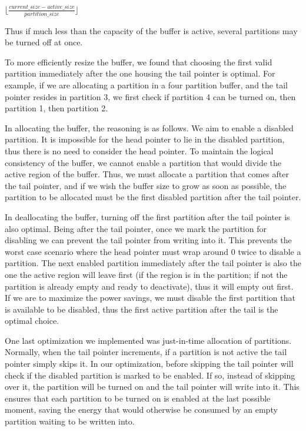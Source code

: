 \begin{center}
$\lfloor \frac{current\_size - active\_size}{partition\_size} \rfloor$
\end{center}

Thus if much less than the capacity of the buffer is active, several partitions may be turned off at once.

To more efficiently resize the buffer, we found that choosing the first valid partition immediately after the one housing the tail pointer is optimal. For example, if we are allocating a partition in a four partition buffer, and the tail pointer resides in partition 3, we first check if partition 4 can be turned on, then partition 1, then partition 2.

In allocating the buffer, the reasoning is as follows. We aim to enable a disabled partition. It is impossible for the head pointer to lie in the disabled partition, thus there is no need to consider the head pointer. To maintain the logical consistency of the buffer, we cannot enable a partition that would divide the active region of the buffer. Thus, we must allocate a partition that comes after the tail pointer, and if we wish the buffer size to grow as soon as possible, the partition to be allocated must be the first disabled partition after the tail pointer.

In deallocating the buffer, turning off the first partition after the tail pointer is also optimal. Being after the tail pointer, once we mark the partition for disabling we can prevent the tail pointer from writing into it. This prevents the worst case scenario where the head pointer must wrap around 0 twice to disable a partition. The next enabled partition immediately after the tail pointer is also the one the active region will leave first (if the region is in the partition; if not the partition is already empty and ready to deactivate), thus it will empty out first. If we are to maximize the power savings, we must disable the first partition that is available to be disabled, thus the first active partition after the tail is the optimal choice.

One last optimization we implemented was just-in-time allocation of partitions. Normally, when the tail pointer increments, if a partition is not active the tail pointer simply skips it. In our optimization, before skipping the tail pointer will check if the disabled partition is marked to be enabled. If so, instead of skipping over it, the partition will be turned on and the tail pointer will write into it. This ensures that each partition to be turned on is enabled at the last possible moment, saving the energy that would otherwise be consumed by an empty partition waiting to be written into.

